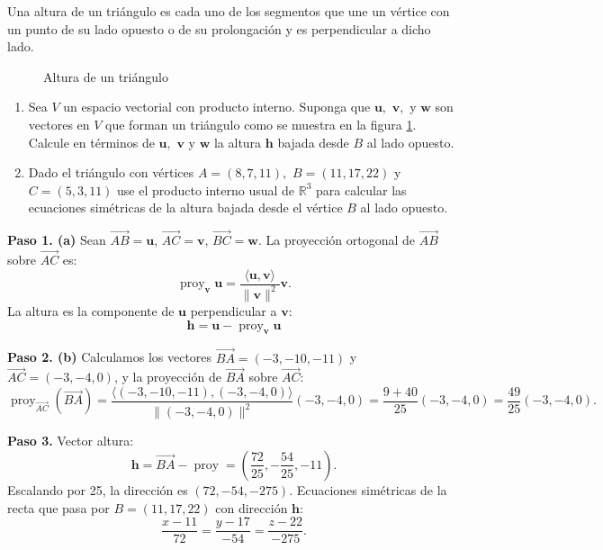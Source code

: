 \begin{prob}
Una altura de un triángulo es cada uno de los segmentos que une un vértice con un punto de su lado opuesto o de su prolongación y es perpendicular a dicho lado.
\begin{figure}[!htbp]
\centering
{}
\caption{Altura de un triángulo}\label{fig:altura_triangulo}
\end{figure}
\begin{enumerate}
\item Sea $V$ un espacio vectorial con producto interno. Suponga que $\mathbf{u},$ $\mathbf{v},$ y $\mathbf{w}$ son vectores en $V$ que forman un triángulo como se muestra en la figura \ref{fig:altura_triangulo}. Calcule en términos de $\mathbf{u},$ $\mathbf{v}$ y $\mathbf{w}$ la altura $\mathbf{h}$ bajada desde $B$ al lado opuesto.
\item Dado el triángulo con vértices $A=(8,7,11),$ $B=(11,17,22)$ y $C=(5,3,11)$ use el producto interno usual de $\mathbb{R}^3$ para calcular las ecuaciones simétricas de la altura bajada desde el vértice $B$ al lado opuesto.
\end{enumerate}
\begin{myproof}
\textbf{Paso 1. (a)} Sean \( \overrightarrow{AB} = \mathbf{u} \), \( \overrightarrow{AC} = \mathbf{v} \), \( \overrightarrow{BC} = \mathbf{w} \). La proyección ortogonal de \( \overrightarrow{AB} \) sobre \( \overrightarrow{AC} \) es:
\[
\operatorname{proy}_{\mathbf{v}} \mathbf{u} = \frac{\langle \mathbf{u}, \mathbf{v} \rangle}{\|\mathbf{v}\|^2} \mathbf{v}.
\]
La altura es la componente de $\mathbf{u}$ perpendicular a $\mathbf{v}$:
\[
\boxed{\mathbf{h} = \mathbf{u} - \operatorname{proy}_{\mathbf{v}} \mathbf{u}}
\]

\textbf{Paso 2. (b)} Calculamos los vectores \( \overrightarrow{BA} = (-3, -10, -11) \) y \( \overrightarrow{AC} = (-3, -4, 0) \), y la proyección de \( \overrightarrow{BA} \) sobre \( \overrightarrow{AC} \):
\[
\operatorname{proy}_{\overrightarrow{AC}}(\overrightarrow{BA}) = \frac{\langle (-3,-10,-11), (-3,-4,0) \rangle}{\|(-3,-4,0)\|^2} (-3,-4,0) = \frac{9+40}{25}(-3,-4,0) = \frac{49}{25}(-3,-4,0).
\]

\textbf{Paso 3.} Vector altura:
\[
\mathbf{h} = \overrightarrow{BA} - \operatorname{proy} = \left(\frac{72}{25}, -\frac{54}{25}, -11\right).
\]
Escalando por 25, la dirección es $(72,-54,-275)$. Ecuaciones simétricas de la recta que pasa por \(B=(11,17,22)\) con dirección \(\mathbf{h}\):
\[
\boxed{\frac{x-11}{72} = \frac{y-17}{-54} = \frac{z-22}{-275}}.
\]
\end{myproof}
\end{prob}

